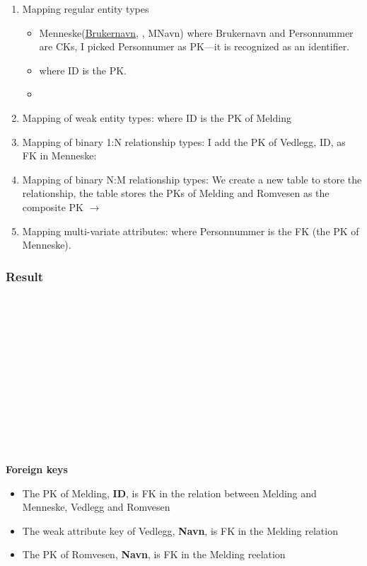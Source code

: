 \documentclass[]{article}
\begin{document}
\begin{enumerate}
	\item Mapping regular entity types
		\begin{itemize}
			\item Menneske(\uline{Brukernavn}, , MNavn)  where Brukernavn and Personnummer are CKs, I picked Personnumer as PK—it is recognized as an identifier.

			\item {} where ID is the PK.

			\item {}
		\end{itemize}
	
	\item Mapping of weak entity types:  where ID is the PK of Melding

	\item Mapping of binary 1:N relationship types: I add the PK of Vedlegg, ID, as FK in Menneske: 

	\item Mapping of binary N:M relationship types: We create a new table to store the relationship, the table stores the PKs of Melding and Romvesen as the composite PK $\rightarrow$ 

	\item Mapping multi-variate attributes:  where Personnummer is the FK (the PK of Menneske).
	
\end{enumerate}

\subsubsection*{Result}

\\ \\
\\ \\
\\ \\
\\ \\
\\ \\
\\ \\
\textbf{Foreign keys}
\begin{itemize}
	\item The PK of Melding, \textbf{ID}, is FK in the relation between Melding and Menneske, Vedlegg and Romvesen 
	
	\item The weak attribute key of Vedlegg, \textbf{Navn}, is FK in the Melding relation
	
	\item The PK of Romvesen, \textbf{Navn}, is FK in the Melding reelation
\end{itemize}
\end{document}
